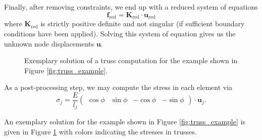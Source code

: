 Finally, after removing constraints, we end up with a reduced system of equations 
\begin{equation}
     \mathbf{f}_\textrm{red} = \mathbf{K}_\textrm{red}  \cdot \mathbf{u}_\textrm{red} 
     \label{eq:reduced_system}
\end{equation}
where $\mathbf{K}_\textrm{red}$ is strictly positive definite and not singular (if sufficient boundary conditions have been applied). Solving this system of equation gives us the unknown node displacements $\mathbf{u}$. 

\begin{figure}[!htpb]
    \centering
    
    \caption{Exemplary solution of a truss computation for the example shown in Figure \ref{fig:truss_example}.}
    \label{fig:truss_example_solved}
\end{figure}

As a post-processing step, we may compute the stress in each element via
\begin{equation}
    \sigma_j = \frac{E}{l_j} 
    \begin{pmatrix}
        \cos{\phi} & \sin{\phi} & -\cos{\phi} & -\sin{\phi}
    \end{pmatrix}
    \cdot 
    \mathbf{u}_j.
\end{equation}

An exemplary solution for the example shown in Figure \ref{fig:truss_example} is given in Figure \ref{fig:truss_example_solved} with colors indicating the stresses in trusses.

